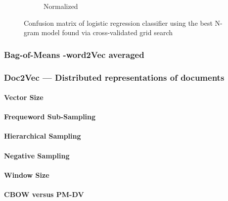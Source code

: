 \begin{figure}[h]
\begin{subfigure}[b]{0.48\textwidth}
        \caption{Normalized}
        \label{fig:exp-vector-space-conf-matrix-logreg-normalized}
    \end{subfigure}
    \caption{Confusion matrix of logistic regression classifier using the best N-gram model found via cross-validated grid search}
  \label{fig:exp-vector-space-conf-matrix-guessing}
\end{figure}




\subsubsection{Bag-of-Means -word2Vec averaged}

\subsubsection{Doc2Vec --- Distributed representations of documents}

\paragraph{Vector Size}

\paragraph{Frequeword Sub-Sampling}

\paragraph{Hierarchical Sampling}

\paragraph{Negative Sampling}

\paragraph{Window Size}

\paragraph{CBOW versus PM-DV}

